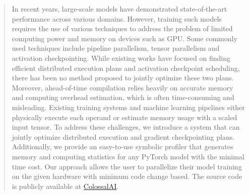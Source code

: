 \begin{abstract}

In recent years, large-scale models have demonstrated state-of-the-art performance across various domains. 
However, training such models requires the use of various techniques to address the problem of limited computing power and memory on devices such as GPU. 
Some commonly used techniques include pipeline parallelism, tensor parallelism and activation checkpointing. 
While existing works have focused on finding efficient distributed execution plans\cite{zheng2022alpa} and activation checkpoint scheduling\cite{herrmann2019optimal}\cite{beaumont2021efficient}, there has been no method proposed to jointly optimize these two plans. 
Moreover, ahead-of-time compilation relies heavily on accurate memory and computing overhead estimation, which is often time-consuming and misleading. Existing training systems and machine learning pipelines either physically execute each operand or estimate memory usage with a scaled input tensor. 
To address these challenges, we introduce a system that can jointly optimize distributed execution and gradient checkpointing plans. 
Additionally, we provide an easy-to-use symbolic profiler that generates memory and computing statistics for any PyTorch model with the minimal time cost. Our approach allows the user to parallelize their model training on the given hardware with minimum code change based. 
The source code is publicly available at \href{https://github.com/hpcaitech/ColossalAI}{ColossalAI}.


\end{abstract}
